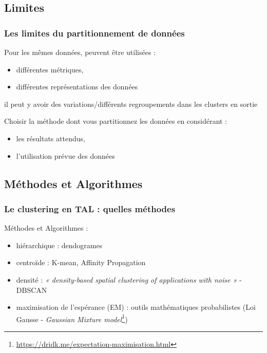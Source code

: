 \subsection{Limites}
\begin{frame}
  \frametitle{Les limites du partitionnement de données}

 Pour les mêmes données, peuvent être utilisées :

\begin{itemize}
  \item {} différentes métriques,
  \item {} différentes représentations des données 
 \end{itemize}

 il peut y avoir des variations/différents regroupements dans les clusters en sortie   

 Choisir la méthode dont vous partitionnez les données en considérant :

 \begin{itemize}
  \item {} les résultats attendus,
  \item {} l’utilisation prévue des données
 \end{itemize}
\end{frame}

\subsection{Méthodes et Algorithmes}
\begin{frame}
  \frametitle{Le clustering en TAL : quelles méthodes}
 Méthodes et Algorithmes :
  \begin{itemize}
  \item {} hiérarchique : dendogrames
  \item {} centroïde : K-mean, Affinity Propagation
  \item {} densité : \textit{« density-based spatial clustering of applications with noise »} - DBSCAN
  \item {} maximisation de l’espérance (EM) : outils mathématiques probabilistes (Loi Gausse - \textit{Gaussian Mixture model}\footnote{\url{https://dridk.me/expectation-maximisation.html}})
  \end{itemize}
\end{frame}

